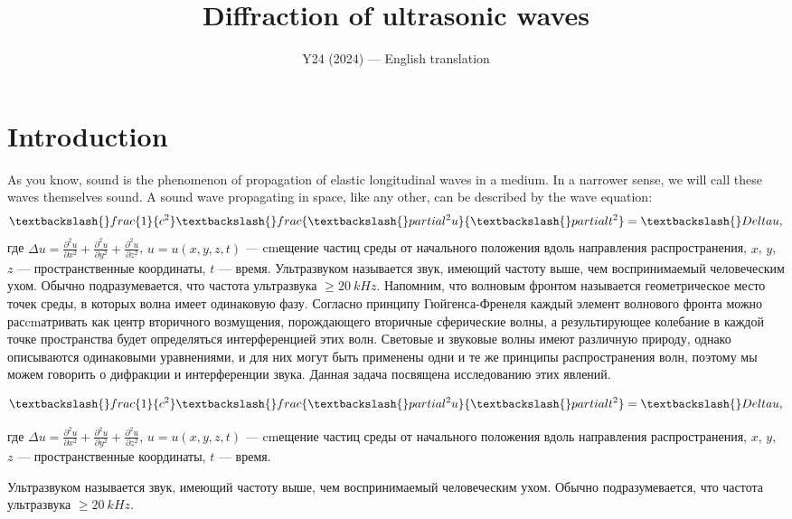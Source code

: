 \documentclass[11pt,a4paper]{article}
\title{\textbf{Diffraction of ultrasonic waves}}
\author{\normalsize Y24 (2024) --- English translation}
\date{}
\begin{document}
\maketitle

\section*{Introduction}

As you know, sound is the phenomenon of propagation of elastic longitudinal waves in a medium. In a narrower sense, we will call these waves themselves sound. A sound wave propagating in space, like any other, can be described by the wave equation: $$\textbackslash\{\}frac\{1\}\{c^2\}\textbackslash\{\}frac\{\textbackslash\{\}partial^2 u\}\{\textbackslash\{\}partial t^2\} = \textbackslash\{\}Delta u,$$ где $\Delta u = \frac{\partial^2 u}{\partial x^2} + \frac{\partial^2 u}{\partial y^2} + \frac{\partial^2 u}{\partial z^2}$, $u = u(x, y, z, t)$ — cmещение частиц среды от начального положения вдоль направления распространения, $x$, $y$, $z$ — пространственные координаты, $t$ — время. Ультразвуком называется звук, имеющий частоту выше, чем воспринимаемый человеческим ухом. Обычно подразумевается, что частота ультразвука $\geq 20~kHz$. Напомним, что волновым фронтом называется геометрическое место точек среды, в которых волна имеет одинаковую фазу. Согласно принципу Гюйгенса-Френеля каждый элемент волнового фронта можно расcmатривать как центр вторичного возмущения, порождающего вторичные сферические волны, а результирующее колебание в каждой точке пространства будет определяться интерференцией этих волн. Световые и звуковые волны имеют различную природу, однако описываются одинаковыми уравнениями, и для них могут быть применены одни и те же принципы распространения волн, поэтому мы можем говорить о дифракции и интерференции звука. Данная задача посвящена исследованию этих явлений.

$$\textbackslash\{\}frac\{1\}\{c^2\}\textbackslash\{\}frac\{\textbackslash\{\}partial^2 u\}\{\textbackslash\{\}partial t^2\} = \textbackslash\{\}Delta u,$$

где $\Delta u = \frac{\partial^2 u}{\partial x^2} + \frac{\partial^2 u}{\partial y^2} + \frac{\partial^2 u}{\partial z^2}$, $u = u(x, y, z, t)$ — cmещение частиц среды от начального положения вдоль направления распространения, $x$, $y$, $z$ — пространственные координаты, $t$ — время.

Ультразвуком называется звук, имеющий частоту выше, чем воспринимаемый человеческим ухом. Обычно подразумевается, что частота ультразвука $\geq 20~kHz$.
\end{document}
